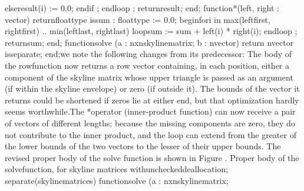          \tyxtstxbf[]else\tyxtstxendbf[]
            result(i) := 0.0;
         \tyxtstxbf[]end\tyxtstxendbf[] \tyxtstxbf[]if%
\tyxtstxendbf[];
      \tyxtstxbf[]end\tyxtstxendbf[] \tyxtstxbf[]loop%
\tyxtstxendbf[];
      \tyxtstxbf[]return\tyxtstxendbf[] result;
   \tyxtstxbf[]end\tyxtstxendbf[];
   \tyxtstxbf[]function\tyxtstxendbf[] \quot[]*\quot[] (left, right : vector) %
\tyxtstxbf[]return\tyxtstxendbf[] float\Symuns[]type %
\tyxtstxbf[]is\tyxtstxendbf[]
      sum : float\Symuns[]type := 0.0;
   \tyxtstxbf[]begin\tyxtstxendbf[]
      \tyxtstxbf[]for\tyxtstxendbf[] i \tyxtstxbf[]in%
\tyxtstxendbf[] max(left\rsquo[]first, right\rsquo[]first) ..
               min(left\rsquo[]last,  right\rsquo[]last) %
\tyxtstxbf[]loop\tyxtstxendbf[]
         sum := sum + left(i) * right(i);
      \tyxtstxbf[]end\tyxtstxendbf[] \tyxtstxbf[]loop%
\tyxtstxendbf[];
      \tyxtstxbf[]return\tyxtstxendbf[] sum;
   \tyxtstxbf[]end\tyxtstxendbf[];
   \tyxtstxbf[]function\tyxtstxendbf[] solve (a : nxn\Symuns[]skyline\Symuns[]matrix;
                   b : n\Symuns[]vector) \tyxtstxbf[]return%
\tyxtstxendbf[] n\Symuns[]vector \tyxtstxbf[]is\tyxtstxendbf[] %
\tyxtstxbf[]separate\tyxtstxendbf[];
\tyxtstxbf[]end\tyxtstxendbf[];\Endcomp[]
\EndParbox[]
\FgEndblock[]
 we note the following changes from its predecessor:
\LstList[]
\LstItem[]The body of the \tyxffmxmono[]row\tyxffmxendmono[] function
now returns a row vector containing, in each position, either a component
of the skyline matrix whose upper triangle is passed as an argument
(if within the skyline envelope) or zero (if outside it). The bounds
of the vector it returns could be shortened if zeros lie at either
end, but that optimization hardly seems worthwhile.\LstEnditem[]
\LstItem[]The \tyxffmxmono[]*\tyxffmxendmono[] operator (inner-product
function) can now receive a pair of vectors of different lengths;
because the missing components are zero, they do not contribute to
the inner product, and the loop can extend from the greater of the
lower bounds of the two vectors to the lesser of their upper bounds.%
\LstEnditem[]
\LstEndlist[]
\Endpara[]
\Para[]The revised proper body of the \tyxffmxmono[]solve%
\tyxffmxendmono[] function is shown in Figure .
\FgBlock[]
\Parbox[]
Proper body of the %
\tyxffmxmono[]solve\tyxffmxendmono[] function, for skyline matrices%
\FgEndcap[]
\Comp[]\tyxtstxbf[]with\tyxtstxendbf[] unchecked\Symuns[]deallocation;
\tyxtstxbf[]separate\tyxtstxendbf[] (skyline\Symuns[]matrices)
\tyxtstxbf[]function\tyxtstxendbf[] solve (a : nxn\Symuns[]skyline\Symuns[]matrix;
